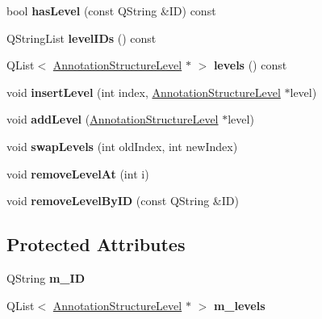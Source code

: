 \begin{DoxyCompactItemize}
\item 
\mbox{\label{class_annotation_structure_a65ea5f1619dec1374f304056f395b27c}} 
bool {\bfseries has\+Level} (const Q\+String \&ID) const
\item 
\mbox{\label{class_annotation_structure_ac38032fb6239f0c5eb5681acc1beae86}} 
Q\+String\+List {\bfseries level\+I\+Ds} () const
\item 
\mbox{\label{class_annotation_structure_a36d4b96578373292bacd3ee2ff0439a4}} 
Q\+List$<$ \hyperlink{class_annotation_structure_level}{Annotation\+Structure\+Level} $\ast$ $>$ {\bfseries levels} () const
\item 
\mbox{\label{class_annotation_structure_af7849d2348a1da8dd5cab4f3e28bb879}} 
void {\bfseries insert\+Level} (int index, \hyperlink{class_annotation_structure_level}{Annotation\+Structure\+Level} $\ast$level)
\item 
\mbox{\label{class_annotation_structure_a7bb81c52071dd4e2f0c3dd225e428a71}} 
void {\bfseries add\+Level} (\hyperlink{class_annotation_structure_level}{Annotation\+Structure\+Level} $\ast$level)
\item 
\mbox{\label{class_annotation_structure_a492abcaf2c4cc847392f06b21679245f}} 
void {\bfseries swap\+Levels} (int old\+Index, int new\+Index)
\item 
\mbox{\label{class_annotation_structure_a54aaa46ab41650f23e07085ecf40b850}} 
void {\bfseries remove\+Level\+At} (int i)
\item 
\mbox{\label{class_annotation_structure_a3d9356bad78e1cb2d2cbb6efd16b2d6b}} 
void {\bfseries remove\+Level\+By\+ID} (const Q\+String \&ID)
\end{DoxyCompactItemize}
\subsection*{Protected Attributes}
\begin{DoxyCompactItemize}
\item 
\mbox{\label{class_annotation_structure_a6c555bdec5573e2ca3f78bb16513ab96}} 
Q\+String {\bfseries m\+\_\+\+ID}
\item 
\mbox{\label{class_annotation_structure_a0885a62d090c26bd9f60bdb6c14f9350}} 
Q\+List$<$ \hyperlink{class_annotation_structure_level}{Annotation\+Structure\+Level} $\ast$ $>$ {\bfseries m\+\_\+levels}
\end{DoxyCompactItemize}


